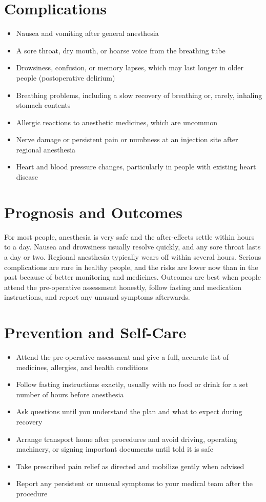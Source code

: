 \section*{Complications}
\begin{itemize}
    \item Nausea and vomiting after general anesthesia
    \item A sore throat, dry mouth, or hoarse voice from the breathing tube
    \item Drowsiness, confusion, or memory lapses, which may last longer in older people (postoperative delirium)
    \item Breathing problems, including a slow recovery of breathing or, rarely, inhaling stomach contents
    \item Allergic reactions to anesthetic medicines, which are uncommon
    \item Nerve damage or persistent pain or numbness at an injection site after regional anesthesia
    \item Heart and blood pressure changes, particularly in people with existing heart disease
\end{itemize}

\section*{Prognosis and Outcomes}
For most people, anesthesia is very safe and the after-effects settle within hours to a day. Nausea and drowsiness usually resolve quickly, and any sore throat lasts a day or two. Regional anesthesia typically wears off within several hours. Serious complications are rare in healthy people, and the risks are lower now than in the past because of better monitoring and medicines. Outcomes are best when people attend the pre-operative assessment honestly, follow fasting and medication instructions, and report any unusual symptoms afterwards.

\section*{Prevention and Self-Care}
\begin{itemize}
    \item Attend the pre-operative assessment and give a full, accurate list of medicines, allergies, and health conditions
    \item Follow fasting instructions exactly, usually with no food or drink for a set number of hours before anesthesia
    \item Ask questions until you understand the plan and what to expect during recovery
    \item Arrange transport home after procedures and avoid driving, operating machinery, or signing important documents until told it is safe
    \item Take prescribed pain relief as directed and mobilize gently when advised
    \item Report any persistent or unusual symptoms to your medical team after the procedure
\end{itemize}


